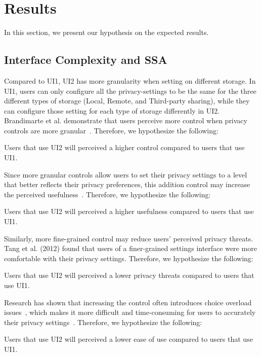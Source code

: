 \section{Results}
In this section, we present our hypothesis on the expected results.

\subsection{Interface Complexity and SSA}
Compared to UI1, UI2 has more granularity when setting on different storage. In UI1, users can only configure all the privacy-settings to be the same for the three different types of storage (Local, Remote, and Third-party sharing), while they can configure those setting for each type of storage differently in UI2. Brandimarte et al. demonstrate that users perceive more control when privacy controls are more granular~\cite{brandimarte2013misplaced}. Therefore, we hypothesize the following:
\theoremgroup
\begin{theorem}
	Users that use UI2 will perceived  a higher control compared to users that use UI1.
\end{theorem}

Since more granular controls allow users to set their privacy settings to a level that better reflects their privacy preferences, this addition control may increase the perceived usefulness~\cite{tang2012implications, al2016modeling}. Therefore, we hypothesize the following:
\begin{theorem}
	Users that use UI2 will perceived a higher usefulness compared to users that use UI1.
\end{theorem}

Similarly, more fine-grained control may reduce users' perceived privacy threats. Tang et al. (2012) found that users of a finer-grained settings interface were more comfortable with their privacy settings. Therefore, we hypothesize the following:
\begin{theorem}
	Users that use UI2 will perceived a lower privacy threats compared to users that use UI1.
\end{theorem}

Research has shown that increasing the control often introduces choice overload issues~\cite{iyengar2000choice, schwartz2004paradox, acquisti2005privacy, acquisti2007can}, which makes it more difficult and time-consuming for users to accurately their privacy settings~\cite{madejski2012study, sadeh2009understanding}. Therefore, we hypothesize the following:
\begin{theorem}
	Users that use UI2 will perceived a lower ease of use compared to users that use UI1.
\end{theorem}

